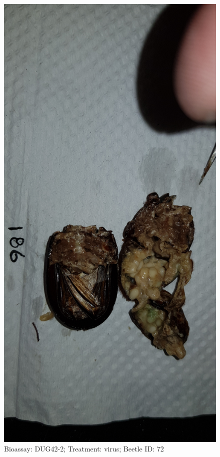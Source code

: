 \documentclass[11pt]{scrartcl}
\begin{document}
\begin{figure}[h!]
    \centering
    \includegraphics[width=\linewidth, height=\textheight, keepaspectratio]{uploads/btl.pm_image.a2228bddd234a4cb.4475673432203138365f5265702d322076697275732e6a7067.jpg}
    \caption{Bioassay: DUG42-2; Treatment: virus; Beetle ID: 72}
\end{figure}
\clearpage
\end{document}
